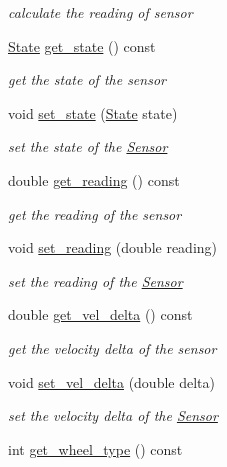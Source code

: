 \begin{DoxyCompactItemize}
\begin{DoxyCompactList}\small\item\em calculate the reading of sensor \end{DoxyCompactList}\item 
\hyperlink{structState}{State} \hyperlink{classSensor_ab15730cde3f1acc0c062f6dfa230e0dd}{get\+\_\+state} () const 
\begin{DoxyCompactList}\small\item\em get the state of the sensor \end{DoxyCompactList}\item 
void \hyperlink{classSensor_aeaf5d980749bd2e423dc6331b3c8d8ee}{set\+\_\+state} (\hyperlink{structState}{State} state)
\begin{DoxyCompactList}\small\item\em set the state of the \hyperlink{classSensor}{Sensor} \end{DoxyCompactList}\item 
double \hyperlink{classSensor_a6e29e3c37b7a4c864a42faa1ec985bc6}{get\+\_\+reading} () const 
\begin{DoxyCompactList}\small\item\em get the reading of the sensor \end{DoxyCompactList}\item 
void \hyperlink{classSensor_a625b6e47344cd827fac400e853240331}{set\+\_\+reading} (double reading)
\begin{DoxyCompactList}\small\item\em set the reading of the \hyperlink{classSensor}{Sensor} \end{DoxyCompactList}\item 
double \hyperlink{classSensor_af96982fe63ceff799e52d677871d6825}{get\+\_\+vel\+\_\+delta} () const 
\begin{DoxyCompactList}\small\item\em get the velocity delta of the sensor \end{DoxyCompactList}\item 
void \hyperlink{classSensor_afadde2949824bbde1ace69d98aa07272}{set\+\_\+vel\+\_\+delta} (double delta)
\begin{DoxyCompactList}\small\item\em set the velocity delta of the \hyperlink{classSensor}{Sensor} \end{DoxyCompactList}\item 
int \hyperlink{classSensor_a3198ff2d54ebd9fe915aed92cccce6d0}{get\+\_\+wheel\+\_\+type} () const 

\end{DoxyCompactItemize}
